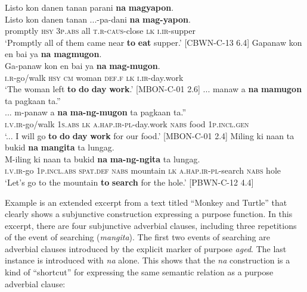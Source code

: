 \ea
Listo  kon  danen  tanan  parani  \textbf{na}  \textbf{magyapon}. \smallskip\\
\gll Listo  kon  danen  tanan  ...-pa-dani  \textbf{na}  \textbf{mag-yapon}. \\
promptly  \textsc{hsy}  3\textsc{p.abs}  all  \textsc{t.r}-\textsc{caus}-close  \textsc{lk}  \textsc{i.ir}-supper \\
\glt ‘Promptly all of them came near \textbf{to} \textbf{eat} supper.’ [CBWN-C-13 6.4]
\z
\ea
Gapanaw  kon  en  bai  ya  \textbf{na}  \textbf{magmugon}. \smallskip\\
\gll Ga-panaw  kon  en  bai  ya  \textbf{na}  \textbf{mag-mugon}. \\
\textsc{i.r}-go/walk  \textsc{hsy}  \textsc{cm}  woman  \textsc{def.f}  \textsc{lk}  \textsc{i.ir}-day.work \\
\glt ‘The woman left \textbf{to} \textbf{do} \textbf{day} \textbf{work}.’ [MBON-C-01 2.6]
\z
\ea
... manaw  a  \textbf{na}  \textbf{mamugon}  ta  pagkaan  ta.” \smallskip\\
\gll ... m-panaw  a  \textbf{na}  \textbf{ma-ng-mugon}  ta  pagkaan  ta.” \\
{}   \textsc{i.v.ir}-go/walk  1\textsc{s.abs}  \textsc{lk}  \textsc{a.hap.ir}-\textsc{pl}-day.work  \textsc{nabs}  food  1\textsc{p.incl.gen} \\
\glt ‘... I will go \textbf{to} \textbf{do} \textbf{day} \textbf{work} for our food.’ [MBON-C-01 2.4]
\z
\ea
\label{bkm:Ref474420292}
Miling  ki  naan  ta  bukid  \textbf{na}  \textbf{mangita} ta  lungag. \smallskip\\
\gll M-iling  ki  naan  ta  bukid  \textbf{na}  \textbf{ma-ng-ngita} ta  lungag. \\
\textsc{i.v.ir}-go  1\textsc{p.incl.abs}  \textsc{spat.def}  \textsc{nabs}  mountain  \textsc{lk}  \textsc{a.hap.ir}-\textsc{pl}-search
\textsc{nabs}  hole \\
\glt `Let’s go to the mountain \textbf{to} \textbf{search} for the hole.’ [PBWN-C-12 4.4]
\z

Example  is an extended excerpt from a text titled “Monkey and Turtle” that clearly shows a subjunctive construction expressing a purpose function. In this excerpt, there are four subjunctive adverbial clauses, including three repetitions of the event of searching (\textit{mangita}). The first two events of searching are adverbial clauses introduced by the explicit marker of purpose \textit{aged}. The last instance is introduced with \textit{na} alone. This shows that the \textit{na} construction is a kind of “shortcut” for expressing the same semantic relation as a purpose adverbial clause:


